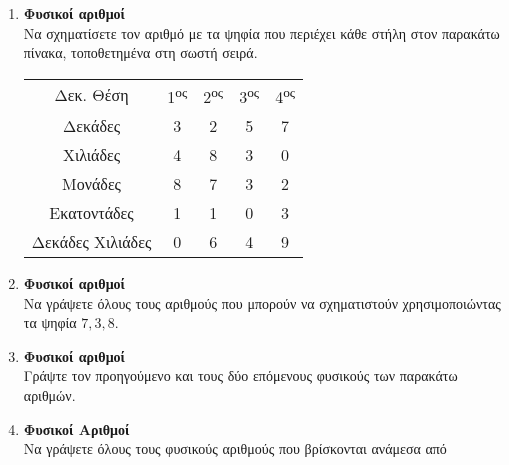 \documentclass[twoside,nofonts,internet]{askhseis}
\newcommand{\tss}[1]{\textsuperscript{#1}}
\begin{document}
\begin{enumerate}[itemsep=5mm]
\item \textbf{Φυσικοί αριθμοί}\\
Να σχηματίσετε τον αριθμό με τα ψηφία που περιέχει κάθε στήλη στον παρακάτω πίνακα, τοποθετημένα στη σωστή σειρά.
\begin{center}
\begin{tabular}{c|c|c|c|c} 
\hline \rule[-1.5ex]{0pt}{5ex} Δεκ. Θέση & 1\tss{ος} & 2\tss{ος} & 3\tss{ος} & 4\tss{ος} \\ 
\hhline{=====} \rule[-1.5ex]{0pt}{5ex} Δεκάδες & 3 & 2 & 5 & 7 \\ 
\rule[-1.5ex]{0pt}{5ex} Χιλιάδες & 4 & 8 & 3 & 0 \\ 
\rule[-1.5ex]{0pt}{5ex} Μονάδες & 8 & 7 & 3 & 2 \\ 
\rule[-1.5ex]{0pt}{5ex} Εκατοντάδες & 1 & 1 & 0 & 3 \\ 
\rule[-1.5ex]{0pt}{5ex} Δεκάδες Χιλιάδες & 0 & 6 & 4 & 9 \\ 
\hline 
\end{tabular} 
\end{center}
\item \textbf{Φυσικοί αριθμοί}\\
Να γράψετε όλους τους αριθμούς που μπορούν να σχηματιστούν χρησιμοποιώντας τα ψηφία $ 7,3,8 $.
\item \textbf{Φυσικοί αριθμοί}\\
Γράψτε τον προηγούμενο και τους δύο επόμενους φυσικούς των παρακάτω αριθμών.
\begin{multicols}{3}
\end{multicols}
\item \textbf{Φυσικοί Αριθμοί}\\
Να γράψετε όλους τους φυσικούς αριθμούς που βρίσκονται ανάμεσα από

\end{enumerate}
\end{document}
